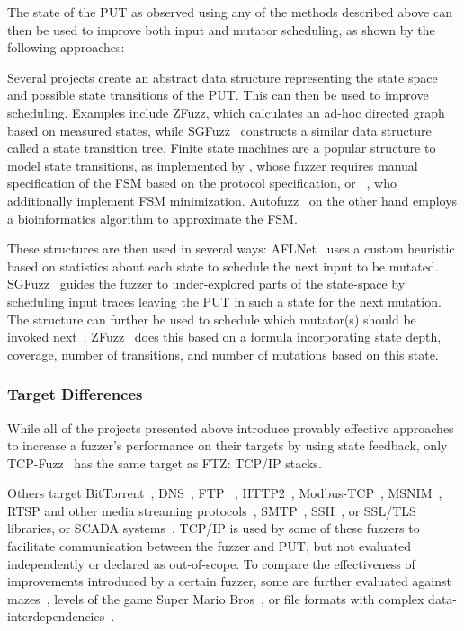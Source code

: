 \documentclass[twocolumn]{article}
\newcommand{\proj}{FTZ\xspace}
\let\savedCite=\cite
\renewcommand{\cite}{\unskip~\savedCite}
\begin{document}
The state of the PUT as observed using any of the methods described above can then be used to improve both input and mutator scheduling, as shown by the following approaches:

Several projects create an abstract data structure representing the state space and possible state transitions of the PUT. This can then be used to improve scheduling. Examples include ZFuzz, which calculates an ad-hoc directed graph based on measured states, while SGFuzz\cite{SGFuzz} constructs a similar data structure called a state transition tree. Finite state machines are a popular structure to model state transitions, as implemented by \citeauthor{Congestion}, whose fuzzer requires manual specification of the FSM based on the protocol specification, or \citeauthor{ModelBased}\cite{ModelBased}, who additionally implement FSM minimization. Autofuzz\cite{Autofuzz} on the other hand employs a bioinformatics algorithm to approximate the FSM.

These structures are then used in several ways: AFLNet\cite{AFLNET} uses a custom heuristic based on statistics about each state to schedule the next input to be mutated. SGFuzz\cite{SGFuzz} guides the fuzzer to under-explored parts of the state-space by scheduling input traces leaving the PUT in such a state for the next mutation. The structure can further be used to schedule which mutator(s) should be invoked next\cite{ModelBased}. ZFuzz\cite{ZFuzz} does this based on a formula incorporating state depth, coverage, number of transitions, and number of mutations based on this state.

\subsubsection{Target Differences}
\label{RelatedWorks:ProtocolFuzzing:TargetDifferences}

While all of the projects presented above introduce provably effective approaches to increase a fuzzer's performance on their targets by using state feedback, only TCP-Fuzz\cite{TCPFuzz} has the same target as \proj: TCP/IP stacks.

Others target BitTorrent\cite{Ankou}, DNS\cite{StateAFL}, FTP \cite{AFLNET, FitM, StateAFL, Autofuzz,ZFuzz}, HTTP2\cite{SGFuzz}, Modbus-TCP\cite{ModbusTCP,ModbusTCP2, GANFuzz, MTA, MTFStorm, AnotherModbusTCP}, MSNIM\cite{ModelBased}, RTSP and other media streaming protocols\cite{AFLNET, SGFuzz}, SMTP\cite{StateAFL}, SSH\cite{StateAFL}, or SSL/TLS\cite{SGFuzz,ZFuzz,DDFuzz} libraries, or SCADA systems\cite{EPF}. TCP/IP is used by some of these fuzzers to facilitate communication between the fuzzer and PUT, but not evaluated independently or declared as out-of-scope. To compare the effectiveness of improvements introduced by a certain fuzzer, some are further evaluated against mazes\cite{Ijon, SandPuppy}, levels of the game Super Mario Bros\cite{Ijon, SandPuppy}, or file formats with complex data-interdependencies\cite{Ijon, SandPuppy, DDFuzz, Ankou}.
\end{document}
